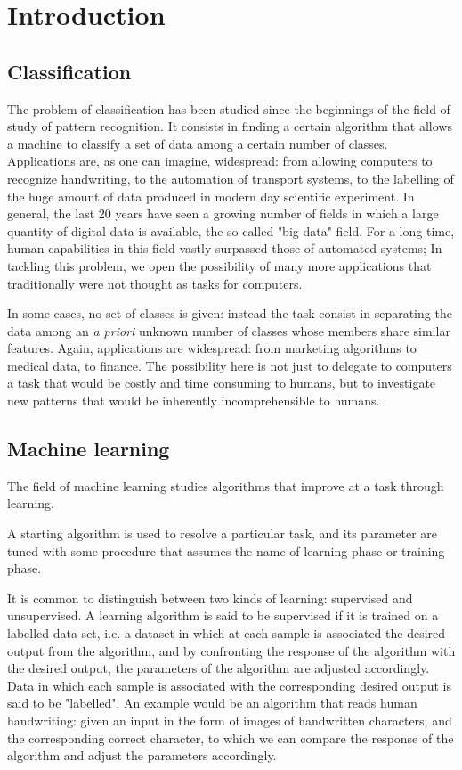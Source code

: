 \documentclass[a4paper]{report}
\begin{document}
\listoftodos

\chapter{Introduction}
\section{Classification}
The problem of classification has been studied since the beginnings of the field of study of pattern recognition.
It consists in finding a certain algorithm that allows a machine to classify a set of data among a certain number of classes.
Applications are, as one can imagine, widespread:
from allowing computers to recognize handwriting, to the automation of transport systems, to the labelling of the huge amount of data produced in modern day scientific experiment.
In general, the last 20 years have seen a growing number of fields in which a large quantity of digital data is available, the so called "big data" field.
For a long time, human capabilities in this field vastly surpassed those of automated systems;
In tackling this problem, we open the possibility of many more applications that traditionally were not thought as  tasks for computers.

In some cases, no set of classes is given:
instead the task consist in separating the data among an \textit{a priori} unknown number of classes whose members share similar features.
Again, applications are widespread:
from marketing algorithms to medical data, to finance.
The possibility here is not just to delegate to computers a task that would be costly and time consuming to humans, but to investigate new patterns that would be inherently incomprehensible to humans.


\section{Machine learning}
The field of machine learning studies algorithms that improve at a task through learning.

A starting algorithm is used to resolve a particular task, and its parameter are tuned with some procedure that assumes the name of learning phase or training phase.

It is common to distinguish between two kinds of learning:
supervised and unsupervised.
A learning algorithm is said to be supervised if it is trained on a labelled data-set, i.e.
a dataset in which at each sample is associated the desired output from the algorithm, and by confronting the response of the algorithm with the desired output, the parameters of the algorithm are adjusted accordingly.
Data in which each sample is associated with the corresponding desired output is said to be "labelled".
An example would be an algorithm that reads human handwriting:
given an input in the form of images of handwritten characters, and the corresponding correct character, to which we can compare the response of the algorithm and adjust the parameters accordingly.
\end{document}

